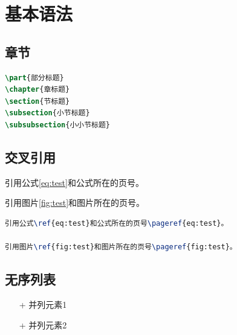 \chapter{基本语法}

\section{章节}

\begin{lstlisting}[language=tex]
\part{部分标题}
\chapter{章标题}
\section{节标题}
\subsection{小节标题}
\subsubsection{小小节标题}
\end{lstlisting}

\section{交叉引用}

引用公式\ref{eq:test}和公式所在的页号\pageref{eq:test}。

引用图片\ref{fig:test}和图片所在的页号\pageref{fig:test}。

\begin{lstlisting}[language=tex]
引用公式\ref{eq:test}和公式所在的页号\pageref{eq:test}。

引用图片\ref{fig:test}和图片所在的页号\pageref{fig:test}。
\end{lstlisting}


\section{无序列表}

\begin{enumerate}
	\item[+] 并列元素1
	\item[+] 并列元素2
\end{enumerate}

